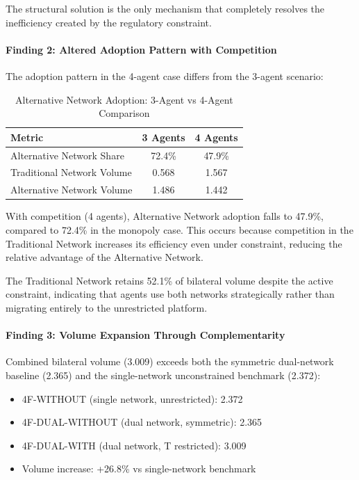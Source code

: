 The structural solution is the only mechanism that completely resolves the inefficiency created by the regulatory constraint.

\paragraph{Finding 2: Altered Adoption Pattern with Competition}

The adoption pattern in the 4-agent case differs from the 3-agent scenario:

\begin{table}[h]
\centering
\caption{Alternative Network Adoption: 3-Agent vs 4-Agent Comparison}
\label{tab:adoption_comparison}
\begin{tabular}{lcc}
\hline
\textbf{Metric} & \textbf{3 Agents} & \textbf{4 Agents} \\ \hline
Alternative Network Share & 72.4\% & 47.9\% \\
Traditional Network Volume & 0.568 & 1.567 \\
Alternative Network Volume & 1.486 & 1.442 \\
\hline
\end{tabular}
\end{table}

With competition (4 agents), Alternative Network adoption falls to 47.9\%, compared to 72.4\% in the monopoly case. This occurs because competition in the Traditional Network increases its efficiency even under constraint, reducing the relative advantage of the Alternative Network.

The Traditional Network retains 52.1\% of bilateral volume despite the active constraint, indicating that agents use both networks strategically rather than migrating entirely to the unrestricted platform.

\paragraph{Finding 3: Volume Expansion Through Complementarity}

Combined bilateral volume (3.009) exceeds both the symmetric dual-network baseline (2.365) and the single-network unconstrained benchmark (2.372):

\begin{itemize}
    \item 4F-WITHOUT (single network, unrestricted): 2.372
    \item 4F-DUAL-WITHOUT (dual network, symmetric): 2.365
    \item 4F-DUAL-WITH (dual network, T restricted): 3.009
    \item Volume increase: +26.8\% vs single-network benchmark
\end{itemize}

